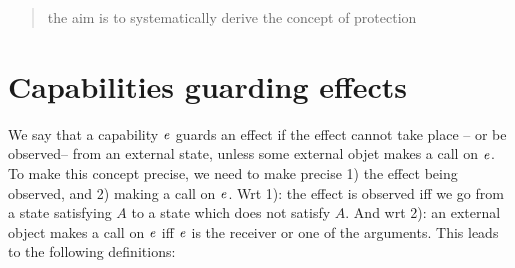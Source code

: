 \documentclass[acmsmall,review,anonymous,screen]{acmart}\settopmatter{printfolios=true,printacmref=false}
\begin{document}




  







\begin{abstract}

the aim is to systematically derive the concept of protection
\end{abstract}

\maketitle 

\section{Capabilities guarding effects}

\newcommand{\Eff}{E\!f\!f}

We say that a capability $\mathit{e}$ guards an effect %
if the effect cannot take place -- or be observed--  from an  external state, unless some external objet makes a call on $\mathit{e}$.  To make this concept precise, we need to make precise 1) the effect   being observed, and 2) making a call on $\mathit{e}$. Wrt 1): the effect   is observed iff we go from a state satisfying $A$ to a state which does not satisfy $A$. And wrt 2): an external object makes a call on $\mathit{e}$ iff $\mathit{e}$ is the receiver or one of the arguments. This leads to the following definitions:


\newcommand{\ExtCallsOn}[1]{ {\mathcal E}\!\mathit{xt}{\mathcal C}\!\mathit{ll}{\mathcal O\!}\mathit{n}(#1)}
\newcommand{\callsOn}[1] {{\ensuremath{\mathcal C}\!{\mathit{lld}}(#1)}}
\end{document}

